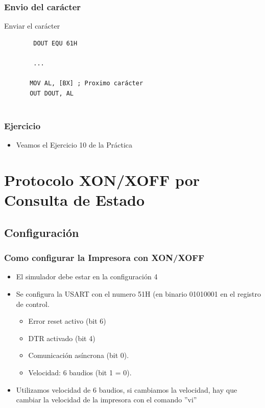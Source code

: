 \documentclass{beamer}
\begin{document}
\begin{frame}[fragile]
\frametitle{Envio del carácter}
\begin{block}{Enviar el carácter}
 \begin{verbatim}
        DOUT EQU 61H
         
        ...
           
       MOV AL, [BX] ; Proximo carácter
       OUT DOUT, AL
             
 \end{verbatim}
\end{block}

\end{frame}


\begin{frame}[fragile]
\frametitle{Ejercicio}

\begin{itemize}
 \item Veamos el Ejercicio 10 de la Práctica
\end{itemize}

\end{frame}

\section{Protocolo XON/XOFF por Consulta de Estado}

\subsection{Configuración}

\begin{frame}[fragile]
\frametitle{Como configurar la Impresora con XON/XOFF}
\begin{itemize}
 \item El simulador debe estar en la configuración 4
 \item Se configura la USART con el numero 51H (en binario 01010001 en el registro de control.
 \begin{itemize}
 \item Error reset activo (bit 6)
 \item DTR activado (bit 4)
 \item Comunicación asíncrona (bit 0). 
 \item Velocidad: 6 baudios (bit 1 = 0).
\end{itemize}
\item Utilizamos velocidad de 6 baudios, si cambiamos la velocidad, hay que cambiar la velocidad de la impresora con el comando ''vi''
 \end{itemize}
\end{frame}
\end{document}
